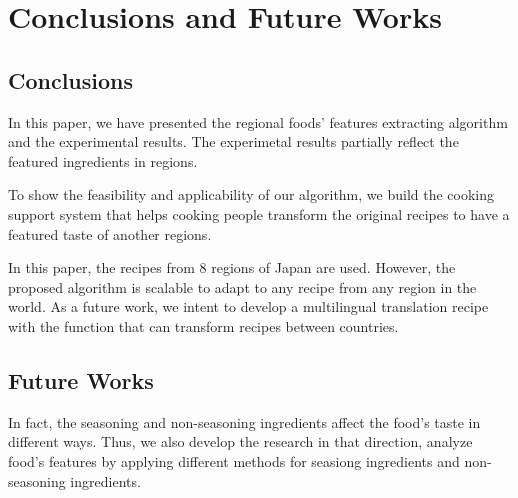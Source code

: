 \chapter{Conclusions and Future Works}\label{chap:conc}
\section{Conclusions}\label{sec:conc_conclucsion}

In this paper, we have presented the regional foods' features extracting algorithm and the experimental results. The experimetal results partially reflect the featured ingredients in regions. 

To show the feasibility and applicability of our algorithm, we build the cooking support system that helps cooking people transform the original recipes to have a featured taste of another regions.  

In this paper, the recipes from 8 regions of Japan are used. However, the proposed algorithm is scalable to adapt to any recipe from any region in the world. As a future work, we intent to develop a multilingual translation recipe with the function that can transform recipes between countries. 


\section{Future Works}\label{sec:conc_future}

In fact, the seasoning and non-seasoning ingredients affect the food's taste in different ways. Thus, we also develop the research in that direction, analyze food's features by applying different methods for seasiong ingredients and non-seasoning ingredients.



